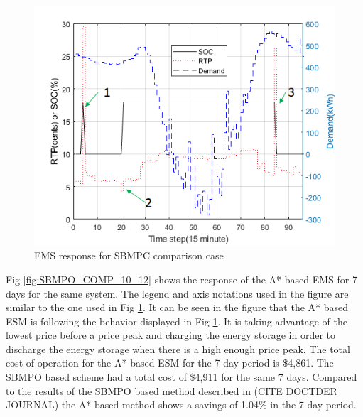   \begin{figure}[!ht]
    \centering
    \includegraphics[width = \linewidth]{figs/SBMPO_COMP_1_day.png}
    \caption{EMS response for SBMPC comparison case}
    \label{fig:SBMPO_COMP_1_day}
\end{figure}

 Fig \ref{fig:SBMPO_COMP_10_12} shows the response of the A* based EMS for 7 days for the same system. The legend and axis notations used in the figure are similar to the one used in Fig \ref{fig:SBMPO_COMP_1_day}. It can be seen in the figure that the A* based ESM is following the behavior displayed in Fig \ref{fig:SBMPO_COMP_1_day}. It is taking advantage of the lowest price before a price peak and charging the energy storage in order to discharge the energy storage when there is a high enough price peak. The total cost of operation for the A* based ESM for the 7 day period is \$4,861. The SBMPO based scheme had a total cost of \$4,911 for the same 7 days. Compared to the results of the SBMPO based method described in \colorbox{BurntOrange}{(CITE DOCTDER JOURNAL)} the A* based method shows a savings of 1.04\% in the 7 day period.
 
